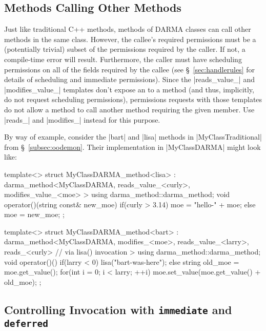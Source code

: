 \subsection{Methods Calling Other Methods}

Just like traditional C++ methods, methods of DARMA classes can call other
methods in the same class.  However, the callee's required permissions must be a
(potentially trivial) subset of the permissions required by the caller.  If not,
a compile-time error will result.  Furthermore, the caller must have scheduling
permissions on all of the fields required by the callee (see
\S~\ref{sec:handlerules} for details of scheduling and immediate permissions). 
Since the |reads_value_| and |modifies_value_| templates don't expose an
\ahandleT to a method (and thus, implicitly, do not request scheduling
permissions), permissions requests with those templates do not allow a method to
call another method requiring the given member.  Use |reads_| and |modifies_| instead for this purpose.

By way of example, consider the |bart| and |lisa| methods in
|MyClassTraditional| from \S~\ref{subsec:oodemon}.  Their implementation in
|MyClassDARMA| might look like:
\begin{CppCodeNumb}
template<>
struct MyClassDARMA_method<lisa>
  : darma_method<MyClassDARMA,
      reads_value_<curly>,
      modifies_value_<moe>
    >
{
  using darma_method::darma_method;
  void operator()(string const& new_moe) {
    if(curly > 3.14) moe = "hello-" + moe;
    else moe = new_moe;
  }
};

template<>
struct MyClassDARMA_method<bart>
  : darma_method<MyClassDARMA,
      modifies_<moe>,
      reads_value_<larry>,
      reads_<curly> // via lisa() invocation
    >
{
  using darma_method::darma_method;
  void operator()() {
    if(larry < 0) lisa("bart-was-here");
    else {
      string old_moe = moe.get_value();
      for(int i = 0; i < larry; ++i) 
        moe.set_value(moe.get_value() + old_moe);
    }
  }
};
\end{CppCodeNumb}

\subsection{Controlling Invocation with \texttt{immediate} and
\texttt{deferred}}

